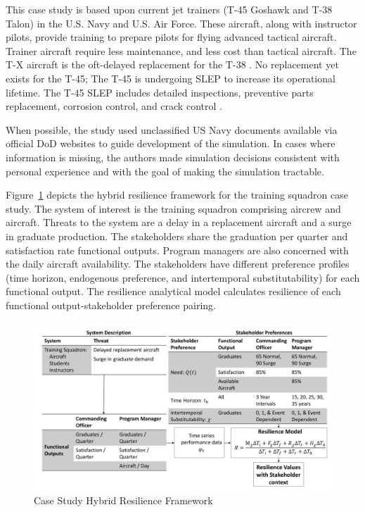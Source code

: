 \documentclass[preprint,12pt]{elsarticle}
\begin{document}
This case study is based upon current jet trainers (T-45 Goshawk and
T-38 Talon) in the U.S. Navy and U.S. Air Force. These aircraft, along
with instructor pilots, provide training to prepare pilots for flying advanced tactical
aircraft. Trainer aircraft require less maintenance, and less cost
than tactical aircraft. The T-X aircraft is the
oft-delayed replacement for the T-38 \cite{Mehta2013}. No replacement
yet exists for the T-45; The T-45 is undergoing SLEP to increase its operational
lifetime. The T-45 SLEP includes detailed inspections, preventive parts 
replacement, corrosion control, and crack control \cite{jennings2018}.

When possible, the study used unclassified US Navy documents
available via official DoD websites to guide development of the
simulation. In cases where information is missing, the authors made
simulation decisions consistent with personal experience and with the
goal of making the simulation tractable.

Figure~\ref{f:FleetFramework} depicts the hybrid resilience framework
for the training squadron case study. The system of interest is the
training squadron comprising aircrew and aircraft. Threats to the
system are a delay in a replacement aircraft and a surge in graduate
production. The stakeholders share the graduation per quarter and
satisfaction rate functional outputs. Program managers are also
concerned with the daily aircraft availability. The stakeholders have
different preference profiles (time horizon, endogenous preference,
and intertemporal substitutability) for each functional output. The
resilience analytical model calculates resilience of each functional
output-stakeholder preference pairing.

\begin{landscape}
\begin{figure}[h]
  \centering\includegraphics[width=8in]{FleetHybridModelDetailedEmb}
  \caption{Case Study Hybrid Resilience Framework}
  \label{f:FleetFramework}
\end{figure}
\end{landscape}
\end{document}
